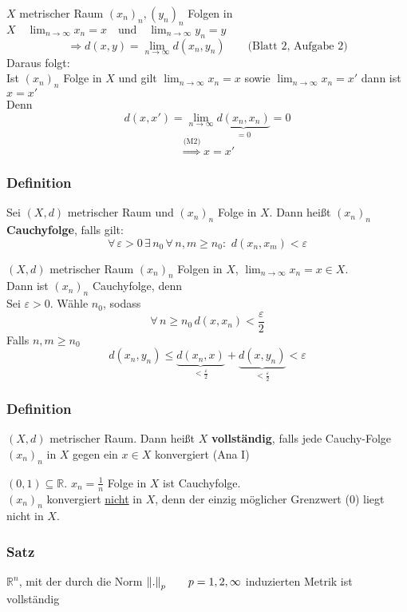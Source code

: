  $X$ metrischer Raum $(x_n)_n , (y_n)_n$ Folgen in $X \quad \lim_{n \to \infty}x_n=x \quad \text{und} \quad \lim_{n \to \infty}y_n=y$
\[
	\Rightarrow d(x,y)=\lim_{n \to \infty}d(x_n,y_n) \qquad \text{(Blatt 2, Aufgabe 2)}
\]
Daraus folgt: \\ Ist $(x_n)_n $ Folge in $X$ und gilt $\lim_{n \to \infty}x_n=x$ sowie $\lim_{n \to \infty}x_n=x'$ dann ist $x=x'$ \\
Denn \[
	d(x,x')=\lim_{n \to \infty}\underset{=0}{\underbrace{d(x_n,x_n)}}=0
\]
\[
	\stackrel{\text{(M2)}}{\Rightarrow} x=x'
\] \bewende

\subsubsection{Definition} %
\label{ssub:definition}
Sei $(X,d)$ metrischer Raum und $(x_n)_n $ Folge in $X$. Dann heißt $(x_n)_n$ {\bfseries Cauchyfolge}, falls gilt:
\[
	\forall\, \varepsilon >0 \, \exists \, n_0 \, \forall\, n,m \geq n_0: \,\, d(x_n,x_m)<\varepsilon 
\]

 $(X,d)$ metrischer Raum $(x_n)_n $ Folgen in $X$, $\lim_{n \to \infty}x_n=x \in X$. \\
Dann ist $(x_n)_n$ Cauchyfolge, denn \\
Sei $\varepsilon >0$. Wähle $n_0$, sodass \[  \forall\, n \geq n_0 \, d(x,x_n)< \frac{\varepsilon}{2} \]
Falls $n,m \geq n_0$
\[
	d(x_n,y_n) \leq \underset{<\frac{\varepsilon}{2}}{\underbrace{d(x_n,x)}} + \underset{<\frac{\varepsilon}{2}}{\underbrace{d(x,y_n)}} < \varepsilon 
\]

\subsubsection{Definition} %
\label{ssub:definition}
$(X,d)$ metrischer Raum. Dann heißt $X$ {\bfseries vollständig}, falls jede Cauchy-Folge $(x_n)_n $ in $X$ gegen ein $x \in X$ konvergiert (Ana I)


	$(0,1) \subseteq \mathbb{R}$.
	$x_n = \frac{1}{n}$ Folge in $X$ ist Cauchyfolge. \\
	$(x_n)_n$ konvergiert \underline{nicht} in $X$, denn der einzig möglicher Grenzwert (0) liegt nicht in $X$.


\subsubsection{Satz} %
\label{ssub:satz}
$\mathbb{R}^n$, mit der durch die Norm $\norm{.}_p \qquad p=1,2,\infty$ induzierten Metrik ist vollständig

